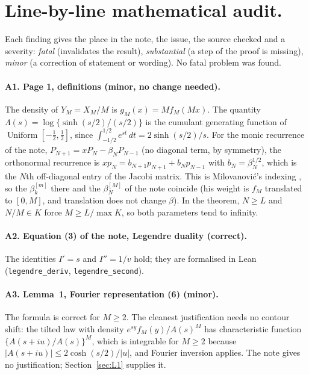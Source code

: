 \documentclass[11pt,a4paper]{article}
\theoremstyle{remark}
\numberwithin{equation}{section}
\begin{document}
\section{Line-by-line mathematical audit.}\label{sec:audit}

Each finding gives the place in the note, the issue, the source checked and a severity:
\emph{fatal} (invalidates the result), \emph{substantial} (a step of the proof is missing),
\emph{minor} (a correction of statement or wording). No fatal problem was found.

\paragraph{A1. Page 1, definitions (minor, no change needed).} The density of $Y_M=X_M/M$ is
$g_M(x)=Mf_M(Mx)$. The quantity $\Lambda(s)=\log\{\sinh(s/2)/(s/2)\}$ is the cumulant
generating function of $\operatorname{Uniform}[-\frac12,\frac12]$, since
$\int_{-1/2}^{1/2}e^{st}\,dt=2\sinh(s/2)/s$. For the monic recurrence of the note,
$P_{N+1}=xP_N-\beta_NP_{N-1}$ (no diagonal term, by symmetry), the orthonormal recurrence
is $xp_N=b_{N+1}p_{N+1}+b_Np_{N-1}$ with $b_N=\beta_N^{1/2}$, which is the $N$th
off-diagonal entry of the Jacobi matrix. This is Milovanovi\'c's indexing
\cite[(2)--(3)]{milovanovic2017}, so the $\beta_k^{[m]}$ there and the $\beta_N^{[M]}$ of the
note coincide (his weight is $f_M$ translated to $[0,M]$, and translation does not change
$\beta$). In the theorem, $N\ge L$ and $N/M\in K$ force $M\ge L/\max K$, so both
parameters tend to infinity.

\paragraph{A2. Equation (3) of the note, Legendre duality (correct).} The identities $I'=s$
and $I''=1/v$ hold; they are formalised in Lean (\texttt{legendre\_deriv},
\texttt{legendre\_second}).

\paragraph{A3. Lemma~1, Fourier representation (6) (minor).} The formula is correct for
$M\ge2$. The cleanest justification needs no contour shift: the tilted law with density
$e^{sy}f_M(y)/A(s)^M$ has characteristic function $\{A(s+iu)/A(s)\}^M$, which is integrable
for $M\ge2$ because $|A(s+iu)|\le2\cosh(s/2)/|u|$, and Fourier inversion applies. The note
gives no justification; Section~\ref{sec:L1} supplies it.
\end{document}
